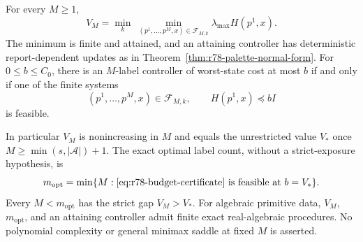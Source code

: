 \begin{theorem}
\label{thm:r78-reset-frontier}
For every $M\ge1$,
\begin{equation}\label{eq:r78-full-frontier}
 V_M=\min_k\ \min_{(p^1,\ldots,p^M,x)\in\mathcal F_{M,k}}
             \lambda_{\max}H(p^1,x).
\end{equation}
The minimum is finite and attained, and an attaining controller has
deterministic report-dependent updates as in
Theorem~\ref{thm:r78-palette-normal-form}.  For $0\le b\le C_0$,
there is an $M$-label controller of worst-state cost at most $b$ if
and only if one of the finite systems
\begin{equation}\label{eq:r78-budget-certificate}
 (p^1,\ldots,p^M,x)\in\mathcal F_{M,k},\qquad
 H(p^1,x)\preccurlyeq bI
\end{equation}
is feasible.

In particular $V_M$ is nonincreasing in $M$ and equals the unrestricted
value $V_*$ once $M\ge\min(s,|\mathcal A|)+1$.  The exact optimal
label count, without a strict-exposure hypothesis, is
\begin{equation}\label{eq:r78-general-threshold}
 m_{\mathrm{opt}}=
 \min\{M:\text{\eqref{eq:r78-budget-certificate} is feasible at }b=V_*\}.
\end{equation}
Every $M<m_{\mathrm{opt}}$ has the strict gap $V_M>V_*$.
For algebraic primitive data, $V_M$, $m_{\mathrm{opt}}$, and an
attaining controller admit finite exact real-algebraic procedures.
No polynomial complexity or general minimax saddle at fixed $M$ is
asserted.
\end{theorem}
